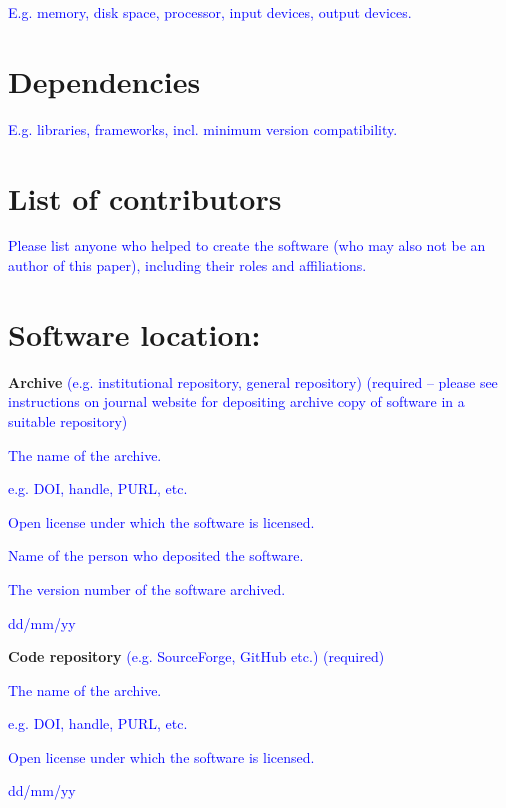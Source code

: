 \documentclass{jors}
\begin{document}
\textcolor{blue}{E.g. memory, disk space, processor, input devices, output devices.}

\section*{Dependencies}

\textcolor{blue}{E.g. libraries, frameworks, incl. minimum version compatibility.}

\section*{List of contributors}

\textcolor{blue}{Please list anyone who helped to create the software (who may also not be an author of this paper), including their roles and affiliations.}

\section*{Software location:}

{\bf Archive} \textcolor{blue}{(e.g. institutional repository, general repository) (required – please see instructions on journal website for depositing archive copy of software in a suitable repository)}

\begin{description}[noitemsep,topsep=0pt]
	\item[Name:] \textcolor{blue}{The name of the archive.}
	\item[Persistent identifier:] \textcolor{blue}{e.g. DOI, handle, PURL, etc.}
	\item[Licence:] \textcolor{blue}{Open license under which the software is licensed.}
	\item[Publisher:]  \textcolor{blue}{Name of the person who deposited the software.}
	\item[Version published:] \textcolor{blue}{The version number of the software archived.}
	\item[Date published:] \textcolor{blue}{dd/mm/yy}
\end{description}



{\bf Code repository} \textcolor{blue}{(e.g. SourceForge, GitHub etc.) (required)}

\begin{description}[noitemsep,topsep=0pt]
	\item[Name:] \textcolor{blue}{The name of the archive.}
	\item[Persistent identifier:] \textcolor{blue}{e.g. DOI, handle, PURL, etc.}
	\item[Licence:] \textcolor{blue}{Open license under which the software is licensed.}
	\item[Date published:] \textcolor{blue}{dd/mm/yy}
\end{description}
\end{document}

